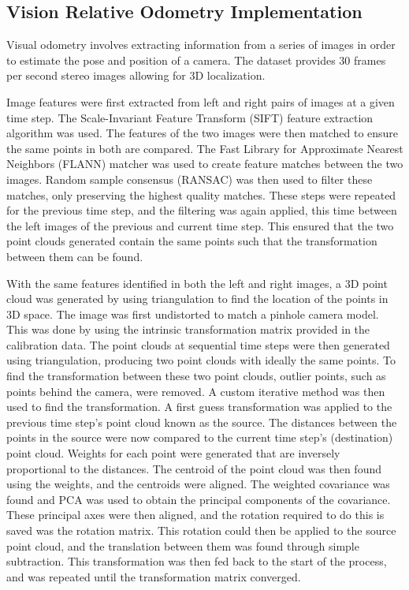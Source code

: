 \documentclass[bare_jrnl_transmag]{subfiles}
\begin{document}
\subsection{Vision Relative Odometry Implementation}

Visual odometry involves extracting information from a series of images in order to estimate the pose and position of a camera. The dataset provides 30 frames per second stereo images allowing for 3D localization. \newline 

Image features were first extracted from left and right pairs of images at a given time step. The Scale-Invariant Feature Transform (SIFT) feature extraction algorithm was used. The features of the two images were then matched to ensure the same points in both are compared. The Fast Library for Approximate Nearest Neighbors (FLANN) matcher was used to create feature matches between the two images.  Random sample consensus (RANSAC) was then used to filter these matches, only preserving the highest quality matches. These steps were repeated for the previous time step, and the filtering was again applied, this time between the left images of the previous and current time step. This ensured that the two point clouds generated contain the same points such that the transformation between them can be found. \newline

With the same features identified in both the left and right images, a 3D point cloud was generated by using triangulation to find the location of the points in 3D space. The image was first undistorted to match a pinhole camera model. This was done by using the intrinsic transformation matrix provided in the calibration data. The point clouds at sequential time steps were then generated using triangulation, producing two point clouds with ideally the same points. To find the transformation between these two point clouds, outlier points, such as points behind the camera, were removed. A custom iterative method was then used to find the transformation. A first guess transformation was applied to the previous time step's point cloud known as the source. The distances between the points in the source were now compared to the current time step's (destination) point cloud. Weights for each point were generated that are inversely proportional to the distances. The centroid of the point cloud was then found using the weights, and the centroids were aligned. The weighted covariance was found and PCA was used to obtain the principal components of the covariance. These principal axes were then aligned, and the rotation required to do this is saved was the rotation matrix. This rotation could then be applied to the source point cloud, and the translation between them was found through simple subtraction. This transformation was then fed back to the start of the process, and was repeated until the transformation matrix converged. \newline
\end{document}
